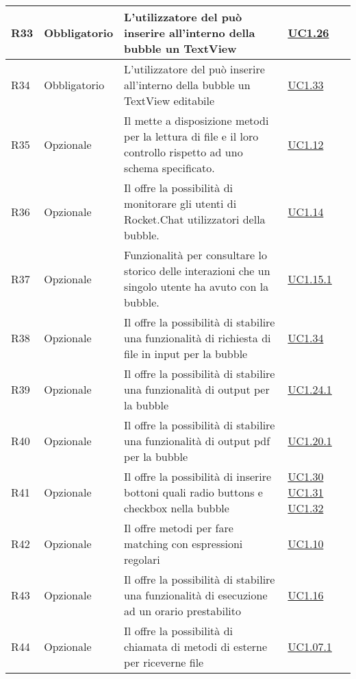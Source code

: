 \begin{longtable}{|P{1.5cm}|P{3cm}|P{6cm}|P{2.5cm}|}
	\hline R33 & Obbligatorio & L’utilizzatore del  può inserire all'interno della bubble un TextView & \hyperref[UC1.26]{UC1.26} \\
	\hline R34 & Obbligatorio & L’utilizzatore del  può inserire all'interno della bubble un TextView editabile & \hyperref[UC1.33]{UC1.33} \\
	\hline R35 & Opzionale & Il  mette a disposizione metodi per la lettura di file  e il loro controllo rispetto ad uno schema specificato. & \hyperref[UC1.12]{UC1.12} \\
	\hline R36 & Opzionale & Il  offre la possibilità di monitorare gli utenti di Rocket.Chat utilizzatori della bubble. & \hyperref[UC1.14]{UC1.14} \\
	\hline R37 & Opzionale & Funzionalità per consultare lo storico delle interazioni che un singolo utente ha avuto con la bubble. & \hyperref[UC1.15.1]{UC1.15.1} \\
	\hline R38 & Opzionale & Il  offre la possibilità di stabilire una funzionalità di richiesta di file in input per la bubble & \hyperref[UC1.34]{UC1.34} \\
	\hline R39 & Opzionale & Il  offre la possibilità di stabilire una funzionalità di output per la bubble & \hyperref[UC1.24.1]{UC1.24.1} \\
	\hline R40 & Opzionale & Il  offre la possibilità di stabilire una funzionalità di output pdf per la bubble & \hyperref[UC1.20.1]{UC1.20.1} \\	
	\hline R41 & Opzionale & Il  offre la possibilità di inserire bottoni quali radio buttons e checkbox nella bubble & \hyperref[UC1.30]{UC1.30} \linebreak \hyperref[UC1.31]{UC1.31} \linebreak \hyperref[UC1.32]{UC1.32} \\
	\hline R42 & Opzionale & Il  offre metodi per fare matching con espressioni regolari
	 & \hyperref[UC1.10]{UC1.10} \\
	\hline R43 & Opzionale & Il  offre la possibilità di stabilire una funzionalità di  esecuzione ad un orario prestabilito & \hyperref[UC1.16]{UC1.16} \\
	\hline R44 & Opzionale & Il  offre la possibilità di chiamata di metodi di  esterne per riceverne file  & \hyperref[UC1.07.1]{UC1.07.1} \\

\end{longtable}
